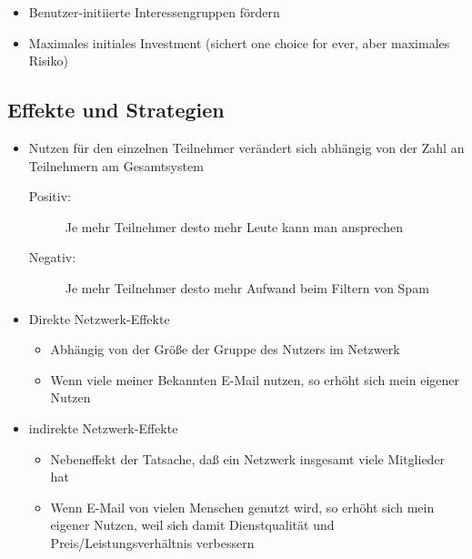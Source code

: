 \documentclass{article} %
\begin{document}
	\begin{itemize}
		\item Benutzer-initiierte Interessengruppen fördern
		\item Maximales initiales Investment (sichert \glqq one choice for ever\grqq, aber maximales Risiko)
	\end{itemize}
	\subsection{Effekte und Strategien}
	\begin{itemize}
		\item Nutzen für den einzelnen Teilnehmer verändert sich
abhängig von der Zahl an Teilnehmern am Gesamtsystem
		\begin{description}
			\item[Positiv:] Je mehr Teilnehmer desto mehr Leute kann man ansprechen
			\item[Negativ:] Je mehr Teilnehmer desto mehr Aufwand beim Filtern von Spam
		\end{description}
		\item Direkte Netzwerk-Effekte
		\begin{itemize}
			\item Abhängig von der Größe der Gruppe des Nutzers im Netzwerk
			\item Wenn viele meiner Bekannten E-Mail nutzen, so erhöht sich mein eigener Nutzen
		\end{itemize}
		\item indirekte Netzwerk-Effekte
		\begin{itemize}
			\item Nebeneffekt der Tatsache, daß ein Netzwerk
insgesamt viele Mitglieder hat
			\item Wenn E-Mail von vielen Menschen genutzt wird, so erhöht
sich mein eigener Nutzen, weil sich damit Dienstqualität und
Preis/Leistungsverhältnis verbessern
		\end{itemize}
	\end{itemize}
\end{document}
